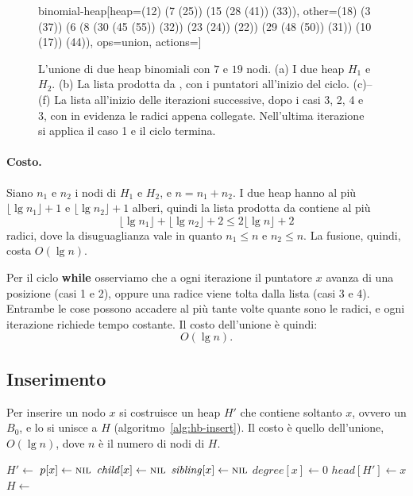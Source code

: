 \begin{figure}[htbp]
\begin{widget}{binomial-heap}[heap={(12) (7 (25)) (15 (28 (41)) (33))}, other={(18) (3 (37)) (6 (8 (30 (45 (55)) (32)) (23 (24)) (22)) (29 (48 (50)) (31)) (10 (17)) (44))}, ops={union}, actions={}]
\end{widget}
\caption{L'unione di due heap binomiali con $7$ e $19$ nodi. (a) I due heap $H_1$ e $H_2$. (b) La lista prodotta da \BinomialHeapMerge{}, con i puntatori all'inizio del ciclo. (c)--(f) La lista all'inizio delle iterazioni successive, dopo i casi 3, 2, 4 e 3, con in evidenza le radici appena collegate. Nell'ultima iterazione si applica il caso 1 e il ciclo termina.}
\label{fig:hb-unione}
\end{figure}

\paragraph{Costo.}
Siano $n_1$ e $n_2$ i nodi di $H_1$ e $H_2$, e $n = n_1 + n_2$. I due heap hanno al più $\lfloor \lg n_1 \rfloor + 1$ e $\lfloor \lg n_2 \rfloor + 1$ alberi, quindi la lista prodotta da \BinomialHeapMerge{} contiene al più
\[
\lfloor \lg n_1 \rfloor + \lfloor \lg n_2 \rfloor + 2 \le 2 \lfloor \lg n \rfloor + 2
\]
radici, dove la disuguaglianza vale in quanto $n_1 \le n$ e $n_2 \le n$. La fusione, quindi, costa $O(\lg n)$.

Per il ciclo \textbf{while} osserviamo che a ogni iterazione il puntatore $x$ avanza di una posizione (casi 1 e 2), oppure una radice viene tolta dalla lista (casi 3 e 4). Entrambe le cose possono accadere al più tante volte quante sono le radici, e ogni iterazione richiede tempo costante. Il costo dell'unione è quindi:
\[
O(\lg n).
\]

\subsection{Inserimento}\label{sec:hb-insert}
Per inserire un nodo $x$ si costruisce un heap $H'$ che contiene soltanto $x$, ovvero un $B_0$, e lo si unisce a $H$ (algoritmo~\ref{alg:hb-insert}). Il costo è quello dell'unione, $O(\lg n)$, dove $n$ è il numero di nodi di $H$.

\begin{algorithm}[htbp]
\caption{L'inserimento del nodo $x$, come unione con un heap che contiene soltanto $x$.}\label{alg:hb-insert}
\begin{algorithmic}[1]
  \State $H' \gets$ 
  \State $p[x] \gets \textsc{nil}$
  \State $\mathit{child}[x] \gets \textsc{nil}$
  \State $\mathit{sibling}[x] \gets \textsc{nil}$
  \State $\mathit{degree}[x] \gets 0$
  \State $\mathit{head}[H'] \gets x$
  \State $H \gets$ 
\EndProcedure
\end{algorithmic}
\end{algorithm}

